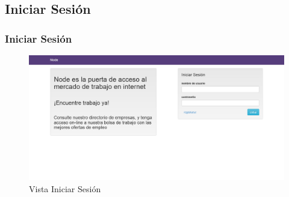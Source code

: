 \subsection{Iniciar Sesi\'on}
\frame
{
  \frametitle{Iniciar Sesión}
  
	\begin{figure}[h]
	\begin{center}
	 	\includegraphics[scale=0.20]{./resources/vistas/login.png} 
		\caption{Vista Iniciar Sesión}
	\end{center}
	\end{figure}
}
